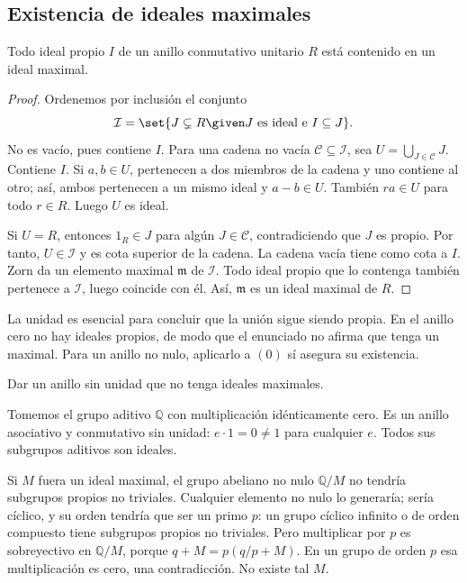 \subsection{Existencia de ideales maximales}
\begin{prop}\label{prop:C17-maximales}
Todo ideal propio $I$ de un anillo conmutativo unitario $R$ está contenido en un ideal maximal.
\end{prop}
\begin{proof}
Ordenemos por inclusión el conjunto
\[
\mathcal I=\set{J\subsetneq R\given J\text{ es ideal e }I\subseteq J}.
\]
No es vacío, pues contiene $I$. Para una cadena no vacía $\mathcal C\subseteq\mathcal I$, sea $U=\bigcup_{J\in\mathcal C}J$. Contiene $I$. Si $a,b\in U$, pertenecen a dos miembros de la cadena y uno contiene al otro; así, ambos pertenecen a un mismo ideal y $a-b\in U$. También $ra\in U$ para todo $r\in R$. Luego $U$ es ideal.

Si $U=R$, entonces $1_R\in J$ para algún $J\in\mathcal C$, contradiciendo que $J$ es propio. Por tanto, $U\in\mathcal I$ y es cota superior de la cadena. La cadena vacía tiene como cota a $I$. Zorn da un elemento maximal $\mathfrak m$ de $\mathcal I$. Todo ideal propio que lo contenga también pertenece a $\mathcal I$, luego coincide con él. Así, $\mathfrak m$ es un ideal maximal de $R$.
\end{proof}
La unidad es esencial para concluir que la unión sigue siendo propia. En el anillo cero no hay ideales propios, de modo que el enunciado no afirma que tenga un maximal. Para un anillo no nulo, aplicarlo a $(0)$ sí asegura su existencia.

\begin{ejer}\label{ejer:C17-sin-unidad}
Dar un anillo sin unidad que no tenga ideales maximales.
\end{ejer}
\begin{sol}
Tomemos el grupo aditivo $\mathbb Q$ con multiplicación idénticamente cero. Es un anillo asociativo y conmutativo sin unidad: $e\cdot1=0\ne1$ para cualquier $e$. Todos sus subgrupos aditivos son ideales.

Si $M$ fuera un ideal maximal, el grupo abeliano no nulo $\mathbb Q/M$ no tendría subgrupos propios no triviales. Cualquier elemento no nulo lo generaría; sería cíclico, y su orden tendría que ser un primo $p$: un grupo cíclico infinito o de orden compuesto tiene subgrupos propios no triviales. Pero multiplicar por $p$ es sobreyectivo en $\mathbb Q/M$, porque $q+M=p(q/p+M)$. En un grupo de orden $p$ esa multiplicación es cero, una contradicción. No existe tal $M$.
\end{sol}

